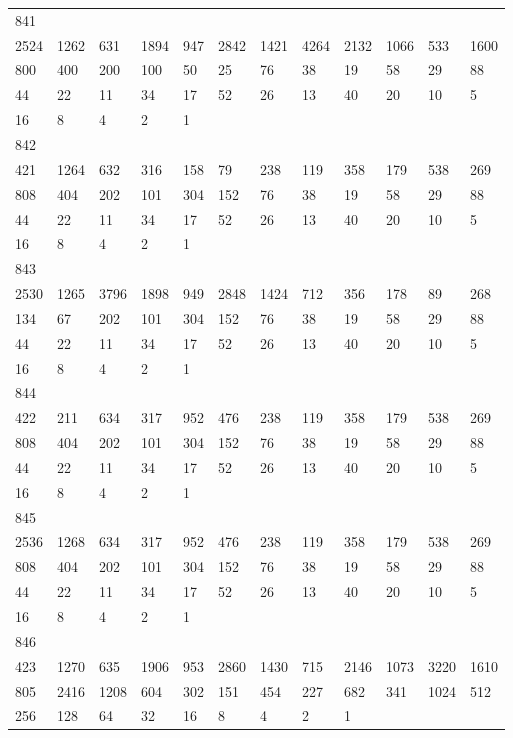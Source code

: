 \begin{longtable}{llllllllllll}
841&&&&&&&&&&&\\
2524& 1262& 631& 1894& 947& 2842& 1421& 4264& 2132& 1066& 533& 1600\\
800& 400& 200& 100& 50& 25& 76& 38& 19& 58& 29& 88\\
44& 22& 11& 34& 17& 52& 26& 13& 40& 20& 10& 5\\
16& 8& 4& 2& 1& \\

842&&&&&&&&&&&\\
421& 1264& 632& 316& 158& 79& 238& 119& 358& 179& 538& 269\\
808& 404& 202& 101& 304& 152& 76& 38& 19& 58& 29& 88\\
44& 22& 11& 34& 17& 52& 26& 13& 40& 20& 10& 5\\
16& 8& 4& 2& 1& \\

843&&&&&&&&&&&\\
2530& 1265& 3796& 1898& 949& 2848& 1424& 712& 356& 178& 89& 268\\
134& 67& 202& 101& 304& 152& 76& 38& 19& 58& 29& 88\\
44& 22& 11& 34& 17& 52& 26& 13& 40& 20& 10& 5\\
16& 8& 4& 2& 1& \\

844&&&&&&&&&&&\\
422& 211& 634& 317& 952& 476& 238& 119& 358& 179& 538& 269\\
808& 404& 202& 101& 304& 152& 76& 38& 19& 58& 29& 88\\
44& 22& 11& 34& 17& 52& 26& 13& 40& 20& 10& 5\\
16& 8& 4& 2& 1& \\

845&&&&&&&&&&&\\
2536& 1268& 634& 317& 952& 476& 238& 119& 358& 179& 538& 269\\
808& 404& 202& 101& 304& 152& 76& 38& 19& 58& 29& 88\\
44& 22& 11& 34& 17& 52& 26& 13& 40& 20& 10& 5\\
16& 8& 4& 2& 1& \\

846&&&&&&&&&&&\\
423& 1270& 635& 1906& 953& 2860& 1430& 715& 2146& 1073& 3220& 1610\\
805& 2416& 1208& 604& 302& 151& 454& 227& 682& 341& 1024& 512\\
256& 128& 64& 32& 16& 8& 4& 2& 1& \\


\end{longtable}
